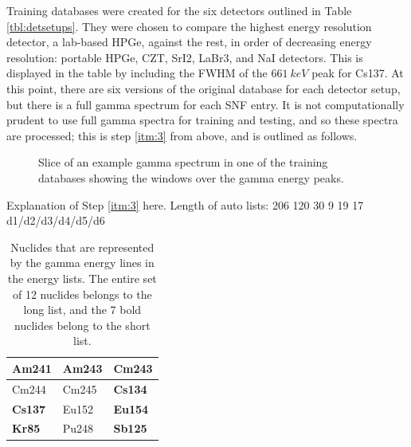 Training databases were created for the six detectors outlined in Table
\ref{tbl:detsetups}. They were chosen to compare the highest energy resolution
detector, a lab-based \gls{HPGe}, against the rest, in order of decreasing
energy resolution: portable \gls{HPGe}, \gls{CZT}, \gls{SrI2}, \gls{LaBr3}, and
\gls{NaI} detectors. This is displayed in the table by including the \gls{FWHM}
of the $661\:keV$ peak for Cs137. At this point, there are six versions of the
original database for each detector setup, but there is a full gamma spectrum
for each \gls{SNF} entry. It is not computationally prudent to use full gamma
spectra for training and testing, and so these spectra are processed; this is
step \ref{itm:3} from above, and is outlined as follows.

\begin{figure}[!htb]
  \caption{Slice of an example gamma spectrum in one of the training databases
           showing the windows over the gamma energy peaks.}
  \label{fig:enwindows}
\end{figure}

Explanation of Step \ref{itm:3} here. Length of auto lists: 206 120 30 9 19 17 d1/d2/d3/d4/d5/d6

\begin{table}[!htb]
  \centering
  \begin{tabular}{@{}|l|l|l|@{}}
    \hline
    \textbf{Am241} & \textbf{Am243} & Cm243          \\ \hline
    Cm244          & Cm245          & \textbf{Cs134} \\ \hline
    \textbf{Cs137} & Eu152          & \textbf{Eu154} \\ \hline
    \textbf{Kr85}  & Pu248          & \textbf{Sb125} \\ \hline
  \end{tabular}
  \caption{Nuclides that are represented by the gamma energy lines in the 
           energy lists. The entire set of 12 nuclides belongs to the long 
           list, and the 7 bold nuclides belong to the short list.}
  \label{tbl:enlistnucs}
\end{table}

